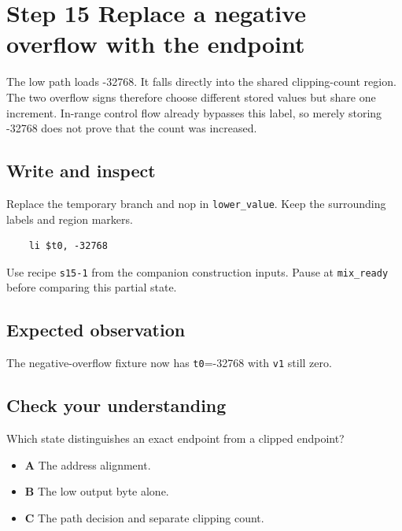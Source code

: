 \section{Step 15 Replace a negative overflow with the endpoint}\label{pcm-s15}

The low path loads -32768. It falls directly into the shared clipping-count region. The two overflow signs therefore choose different stored values but share one increment. In-range control flow already bypasses this label, so merely storing -32768 does not prove that the count was increased.

\subsection{Write and inspect}
Replace the temporary branch and nop in \texttt{lower\_value}. Keep the surrounding labels and region markers.

\begin{verbatim}
    li $t0, -32768
\end{verbatim}
Use recipe \texttt{s15-1} from the companion construction inputs. Pause at \texttt{mix\_ready} before comparing this partial state.

\subsection{Expected observation}
The negative-overflow fixture now has \texttt{t0}=-32768 with \texttt{v1} still zero.

\subsection{Check your understanding}
Which state distinguishes an exact endpoint from a clipped endpoint?

\begin{itemize}
  \item \textbf{A} The address alignment.
  \item \textbf{B} The low output byte alone.
  \item \textbf{C} The path decision and separate clipping count.
\end{itemize}
